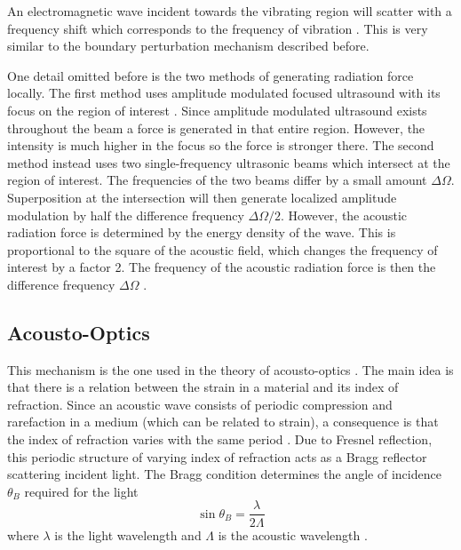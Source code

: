 \documentclass[10pt,a4paper]{eitExjobb}
\begin{document}
	An electromagnetic wave incident towards the vibrating region will scatter with a frequency shift which corresponds to the frequency of vibration \cite{Top2014}. This is very similar to the boundary perturbation mechanism described before.
	
	One detail omitted before is the two methods of generating radiation force locally. The first method uses amplitude modulated focused ultrasound with its focus on the region of interest \cite{Top2016}. Since amplitude modulated ultrasound exists throughout the beam a force is generated in that entire region. However, the intensity is much higher in the focus so the force is stronger there. The second method instead uses two single-frequency ultrasonic beams which intersect at the region of interest. The frequencies of the two beams differ by a small amount $\Delta \Omega$. Superposition at the intersection will then generate localized amplitude modulation by half the difference frequency $\Delta \Omega/2$. However, the acoustic radiation force is determined by the energy density of the wave. This is proportional to the square of the acoustic field, which changes the frequency of interest by a factor 2. The frequency of the acoustic radiation force is then the difference frequency $\Delta \Omega$ \cite{Fatemi1998}.
	
	\subsection{Acousto-Optics}
	This mechanism is the one used in the theory of acousto-optics \cite{Saleh2007}\cite{Korpel1981}. The main idea is that there is a relation between the strain in a material and its index of refraction. Since an acoustic wave consists of periodic compression and rarefaction in a medium (which can be related to strain), a consequence is that the index of refraction varies with the same period \cite{Saleh2007}. Due to Fresnel reflection, this periodic structure of varying index of refraction acts as a Bragg reflector scattering incident light. The Bragg condition determines the angle of incidence $\theta_B$ required for the light
	\begin{equation*}
	\sin{\theta_B} = \frac{\lambda}{2\Lambda}
	\end{equation*}
	where $\lambda$ is the light wavelength and $\Lambda$ is the acoustic wavelength \cite{Saleh2007}.
	
\end{document}
